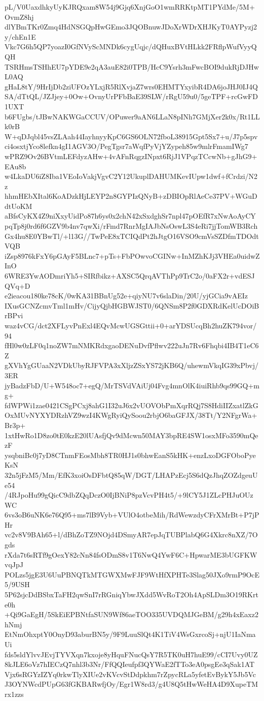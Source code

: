 pL/V0UaxdhkyUyKJRQxam8W54j9Gjq6XnjGoO1wmRRKtpMT1PYdMe/5M+OvmZ8hj
dlYBmTKr0Zmq4HdNSGQpHwGEmo3JQOBnuwJDoXrWDrXHJKyT0AYPyzj2y/chEn1E
Vkc7G6h5QP7yoazI0GfNVyScMNDk6cygUqjc/dQHuxBVtHLkk2FRflpWufVyyQQH
TSRHmsTSHhEU7pYDE9e2qA3auE82i0TPB/HcC9Ysrh3mFwcBOI9dukRjDJHwL0AQ
gHaL8tY/9HrIjDb2ziUFOzYLxjR5RlXvjaZ7wrs0EHMTYxyibR4DA6joJHJ0IJ4Q
SA/dTtQL/JZJjey+0Ow+OvnyUrPFbBaE39SLW/rRgU59u0/5geTPF+rcGwFD1UXT
b6FUgbs/tJBwNAKWGaCCUV/OPuwer9aAN6LLaN8pINh7GMjXer2k0x/Rt1LLk0rB
W+qDJqbl45vsZLAah44IayhnyyKpC6GS6OLN72fboL38915Gpt5Sx7+u/J7p5spv
ci4osxtjYco8lefkn4gI1AGV3O/PegTgsr7aWqfPyVjYZypeh85w9mlrFmamIWg7
wPRZ9Ov26BVtmLEFdyzAHw+4vAFnRqgzINpxt6RjJ1VPqzTCcwNb+gJhG9+EAu8b
w4LkaDU6iZ8Iba1VEoIoVakjVgvC2Y12UkuplDAHUMKevIUpw1dwf+fCrdzi/N2z
hhmHEbXItal6KoADzkHjLEYP2n8GYPIzQNyB+zDBIOpRlAeCe37PV+WGuDdtUoKM
aBfsCyKX4Z9niXxyUidPo87h6ys0x2chN42xSxdghSr7npl47pOEfR7xNwAoAyCY
pqTp8j0rd6f6GZV9b4nv7qwXi/rFmd7RnrMgIAJbNsOswL3S4eRi7jjTomWB3Rch
Gx4hu8E0YBwTl/+l13G//TwPeE8xTCIQdPt2hJtgO16VSO9cmVsSZDfmTDOdtVQB
iZsp8976kFxY6pGAyF5BLnc7+pTs+FbPOwvoCGINw+InMZhKJj3VHEa0uidwZInO
6WRE3YwAODmriYh5+SIRfbikz+AXSC5QrqAVThPp9TrC2o/0aFX2r+vdESJQVq+D
e2ieacou180ke78cK/0wKA31BBnUg52e+qiyNU7v6slaDin/20U/yjGCia9vAEIz
IXusGCNZcmvTml1mHv/CijyQjbHGBWJST0/6QNSm8P2f0GDXRdKelUcDOiBrBPvi
waz4vCG/dct2XFLyvPnExl4EQvMcwUGSGttii+0+arYDSUcqBh2huZK794vor/94
fHl0w0zLF0q1noZW7mNMKRdxgaoDENuDvfPflwv222uJn7Rv6Fhqbi4IB4T1eC6Z
gXVhYgGUaaN2VDkUbyRJFVPA3xXljzZSxYS72jKB6Q/uhewmVkqIG39xPbvj/3ER
jyBadzFbD/U+W548oc7+egQ/MrTSVdVAiUj04Fvg4mnOlK4iuiRhb9qs99GQ+mg+
fdWPWi1zae0421CSgPCxj8ahG1I32uJ6x2vUOVObPmXqrRQj7S8HdiIIZxatlZkG
OxMUvNYXYDRzhVZ9wzI4KWgRyiQySoou2rbjO6baGFJX/38Tt/Y2NFgrWa+Br3p+
1xtHwRo1D8zo0tE0kzE20lUAsfjQv9dMcwn50MAY3bpRE4SW1osxMFo3590mQezF
ysqbniBc0j7yD8CTnmFEosMbh8TR0HJ1s0bhwEanS5kHK+enzLxoDGFOboPyeKsN
32n5jFzM5/Mm/EfK3xoiOsDFbtQ85qW/DGT/LHAPzEcj5S6dQzJhqZOZdgeuUe54
/4RJpoHu99gQicC9dbZQqDczO0IjBNiP8pzVcvPH4t5/+9lCY5J1ZLcPHJuOUzWC
6vs3oB6uNK6e76Q95+ms7lB9Vyb+VUlO4otbeMih/RdWewzdyCFrXMrBt+P7jPHr
vc2v8V9BAh65+l/dBhZoTZ9NOjd4DSmyAR7epJqTUBPlabQ6G4Xkrc8nXZ/7Ogds
rXda7t6sRTf9gOexY82cNn84fsODmS8v1T6NwQ4YwF6C+HpwarME3bUGFKWvqJpJ
POLzs5jgE3U6UuPBNQTkMTGWXMwFJF9WtHfXPHTe3Slag50JXo9rmP9OcE5/9USH
5P62sjcDdBSbxTaFH2qwSnI7rRGniqYbwJXdd5WvRoT2Oh4ApSLDm3O19RKrte0h
+Qi9GaEgH/5SkEiEPBNtfaSUN9Wf86aeTOO335UVDQMJGeBM/g29h4xEaxz2hNmj
EtNmOhxptY0OnyD93aburBN5y/9F9LuuSlQt4K1TiV4WsGxrcoSj+njU1IaNmaUi
fds5sldYlvvJEvjTYVXqn7kxoje8yHquFNucQsY7R5TK0uH7huE99/cCI7Uvy0UZ
8kJLE6oVz7hIECzQ7nhl3b3Nr/FfQQIeufpf3QYWaE2fTTo3eA0psgEe3qSak1AT
Vjx6sRGYzIZYq0rkwTlyXIUe2vKVcvStDdpkhm7rZpycRLa5yfetEvBykY5Jb5Vc
J3OYNWcdPUpG63fGKBARwfjOy/Egr1W8rd3/g4U8Q5tHwWeHA4D9XupeTMrx1zzs
